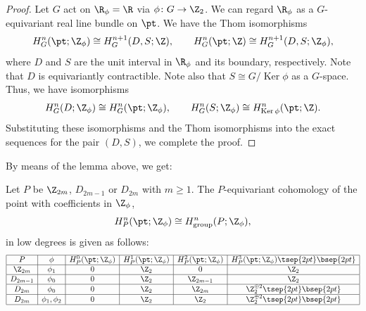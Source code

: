 \begin{proof}
Let $G$ act on $\R_\phi = \R$ via $\phi \colon G \to \Z_2$. We can regard $\R_\phi$ as a $G$-equivariant real line bundle on $\pt$. We have the Thom isomorphisms
\begin{gather*}
H^n_G(\pt; \Z_\phi) \cong H^{n+1}_G(D, S; \Z), \qquad H^n_G(\pt; \Z) \cong H^{n+1}_G(D, S; \Z_\phi),
\end{gather*}
where $D$ and $S$ are the unit interval in $\R_\phi$ and its boundary, respectively. Note that $D$ is equivariantly contractible. Note also that $S \cong G/\operatorname{Ker}\phi$ as a $G$-space. Thus, we have isomorphisms
\begin{gather*}
H^n_G(D; \Z_\phi) \cong H^n_G(\pt; \Z_\phi), \qquad H^n_G(S; \Z_\phi) \cong H^n_{\operatorname{Ker}\phi}(\pt; \Z).
\end{gather*}
Substituting these isomorphisms and the Thom isomorphisms into the exact sequences for the pair $(D, S)$, we complete the proof.
\end{proof}

By means of the lemma above, we get:

\begin{lem} \label{lem:cohomology_of_point_twisted_case}
Let $P$ be $\Z_{2m}$, $D_{2m-1}$ or $D_{2m}$ with $m \ge 1$. The $P$-equivariant cohomology of the point with coefficients in $\Z_\phi$,
\begin{gather*}
H^n_P(\pt; \Z_\phi) \cong H^n_{\mathrm{group}}(P; \Z_\phi),
\end{gather*}
in low degrees is given as follows:
$$
\begin{array}{|c|c|c|c|c|c|}
\hline
P & \phi &
H^0_P(\pt; \Z_\phi) & H^1_P(\pt; \Z_\phi) &
H^2_P(\pt; \Z_\phi) & H^3_P(\pt; \Z_\phi) \tsep{2pt}\bsep{2pt}\\
\hline
\Z_{2m} & \phi_1 &
0 & \Z_2 & 0 & \Z_2 \\
\hline
D_{2m-1} & \phi_0 &
0 & \Z_2 & \Z_{2m-1} & \Z_2 \\
\hline
D_{2m} & \phi_0 &
0 & \Z_2 & \Z_{2m} & \Z_2^{\oplus 2} \tsep{2pt}\bsep{2pt}\\
\hline
D_{2m} & \phi_1, \phi_2 &
0 & \Z_2 & \Z_2 & \Z_2^{\oplus 2} \tsep{2pt}\bsep{2pt}\\
\hline
\end{array}
$$
\end{lem}

